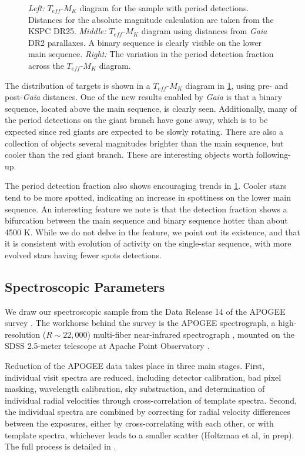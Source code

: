 \documentclass[manuscript]{aastex6}
\newcommand{\Gaia}{\mbox{\textit{Gaia}}}
\newcommand{\Teff}{\ensuremath{T_{eff}}}
\begin{document}
\begin{figure}[htb]
    \centering
    \caption{\emph{Left:} \Teff-\(M_K\) diagram for the \citet{McQuillan14}
    sample with period detections. Distances for the absolute magnitude
calculation are taken from the KSPC DR25. \emph{Middle:} \Teff-\(M_K\) diagram
using distances from \Gaia{} DR2 parallaxes. A binary sequence is clearly
visible on the lower main sequence. \emph{Right:} The variation in the 
\citet{McQuillan14} period detection fraction across the \Teff-\(M_K\) diagram. }
    \label{fig:mcquillan_selection}
\end{figure}

The distribution of \citet{McQuillan14} targets is shown in a \Teff-\(M_K\)
diagram in \cref{fig:mcquillan_selection}, using pre- and post-\Gaia{}
distances. One of the new results enabled by \Gaia{} is that a binary sequence,
located above the main sequence, is clearly seen. Additionally, many of the
period detections on the giant branch have gone away, which is to be expected
since red giants are expected to be slowly rotating. There are also a
collection of objects several magnitudes brighter than the main sequence, but
cooler than the red giant branch. These are interesting objects worth
following-up.

The period detection fraction also shows encouraging trends in
\cref{fig:mcquillan_selection}. Cooler stars tend
to be more spotted, indicating an increase in spottiness on the lower main
sequence. An interesting feature we note is that the detection fraction shows a
bifurcation between the main sequence and binary sequence hotter than about
4500 K. While we do not delve in the feature, we point out its existence, and
that it is consistent with evolution of activity on the single-star sequence, 
with more evolved stars having fewer spots detections.

\subsection{Spectroscopic Parameters}

We draw our spectroscopic sample from the Data Release 14 \citep{Abolfathi18}
of the APOGEE survey \citep{Majewski17}. The workhorse behind the survey is the
APOGEE spectrograph, a high-resolution (\(R \sim 22,000\)) multi-fiber
near-infrared spectrograph \citep{Wilson10}, mounted on the SDSS 2.5-meter
telescope at Apache Point Observatory \citep{Gunn06}.

Reduction of the APOGEE data takes place in three main stages. First,
individual visit spectra are reduced, including detector calibration, bad pixel
masking, wavelength calibration, sky substraction, and determination of
individual radial velocities through cross-correlation of template spectra.
Second, the individual spectra are combined by correcting for radial velocity
differences between the exposures, either by cross-correlating with each other,
or with template spectra, whichever leads to a smaller scatter (Holtzman et
al, in prep). The full process is detailed in \citet{Nidever15}.
\end{document}
